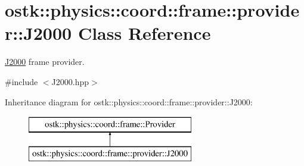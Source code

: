 \hypertarget{classostk_1_1physics_1_1coord_1_1frame_1_1provider_1_1_j2000}{}\section{ostk\+:\+:physics\+:\+:coord\+:\+:frame\+:\+:provider\+:\+:J2000 Class Reference}
\label{classostk_1_1physics_1_1coord_1_1frame_1_1provider_1_1_j2000}


\hyperlink{classostk_1_1physics_1_1coord_1_1frame_1_1provider_1_1_j2000}{J2000} frame provider.  




{\ttfamily \#include $<$J2000.\+hpp$>$}

Inheritance diagram for ostk\+:\+:physics\+:\+:coord\+:\+:frame\+:\+:provider\+:\+:J2000\+:\begin{figure}[H]
\begin{center}
\leavevmode
\includegraphics[height=2.000000cm]{classostk_1_1physics_1_1coord_1_1frame_1_1provider_1_1_j2000}
\end{center}
\end{figure}
